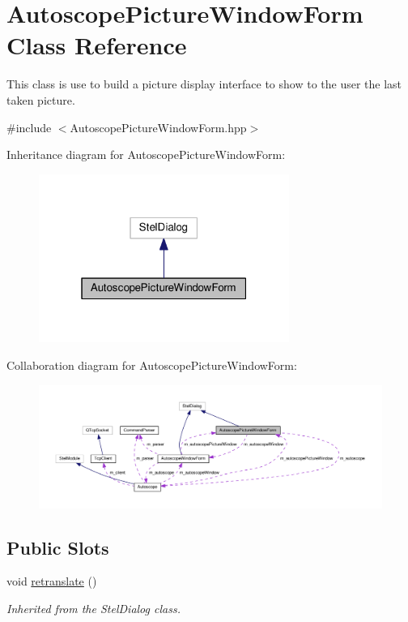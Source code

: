 \hypertarget{class_autoscope_picture_window_form}{}\section{Autoscope\+Picture\+Window\+Form Class Reference}
\label{class_autoscope_picture_window_form}


This class is use to build a picture display interface to show to the user the last taken picture.  




{\ttfamily \#include $<$Autoscope\+Picture\+Window\+Form.\+hpp$>$}



Inheritance diagram for Autoscope\+Picture\+Window\+Form\+:
\nopagebreak
\begin{figure}[H]
\begin{center}
\leavevmode
\includegraphics[width=232pt]{class_autoscope_picture_window_form__inherit__graph}
\end{center}
\end{figure}


Collaboration diagram for Autoscope\+Picture\+Window\+Form\+:
\nopagebreak
\begin{figure}[H]
\begin{center}
\leavevmode
\includegraphics[width=350pt]{class_autoscope_picture_window_form__coll__graph}
\end{center}
\end{figure}
\subsection*{Public Slots}
\begin{DoxyCompactItemize}
\item 
void \hyperlink{class_autoscope_picture_window_form_a4bcc43707d7b76b19d81ffc66a4b7ee2}{retranslate} ()
\begin{DoxyCompactList}\small\item\em Inherited from the Stel\+Dialog class. \end{DoxyCompactList}\end{DoxyCompactItemize}
